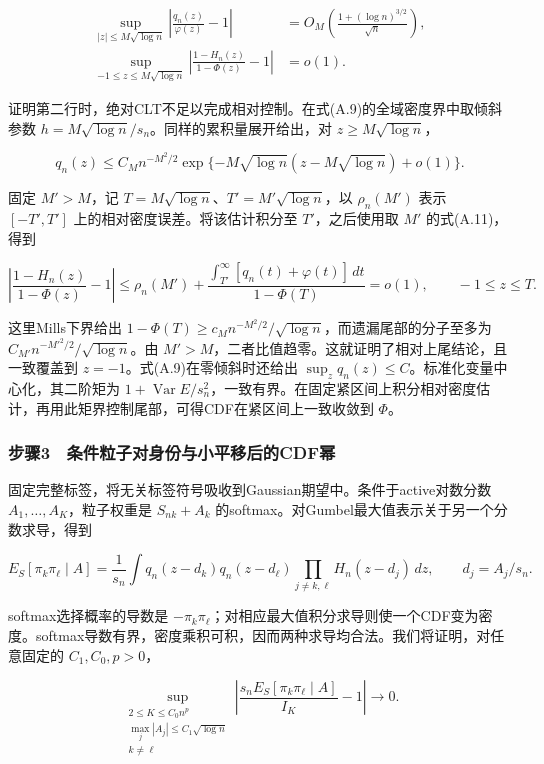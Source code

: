 \documentclass[11pt,a4paper]{article}
\begin{document}
\[
\begin{aligned}
\sup_{|z|\le M\sqrt{\log n}}\left|\frac{q_n(z)}{\varphi(z)}-1\right|
&=O_M\!\left(\frac{1+(\log n)^{3/2}}{\sqrt n}\right),\\
\sup_{-1\le z\le M\sqrt{\log n}}
\left|\frac{1-H_n(z)}{1-\Phi(z)}-1\right|&=o(1).
\end{aligned}
\tag{A.10}
\]

证明第二行时，绝对CLT不足以完成相对控制。在式(A.9)的全域密度界中取倾斜参数
\(h=M\sqrt{\log n}/s_n\)。同样的累积量展开给出，对
\(z\ge M\sqrt{\log n}\)，

\[
q_n(z)\le C_Mn^{-M^2/2}
\exp\{-M\sqrt{\log n}(z-M\sqrt{\log n})+o(1)\}.
\tag{A.11}
\]

固定 \(M'>M\)，记 \(T=M\sqrt{\log n}\)、\(T'=M'\sqrt{\log n}\)，以
\(\rho_n(M')\) 表示 \([-T',T']\) 上的相对密度误差。将该估计积分至
\(T'\)，之后使用取 \(M'\) 的式(A.11)，得到

\[
\left|\frac{1-H_n(z)}{1-\Phi(z)}-1\right|
\le \rho_n(M')+
\frac{\int_{T'}^\infty[q_n(t)+\varphi(t)]\,dt}{1-\Phi(T)}
=o(1),\qquad -1\le z\le T.
\]

这里Mills下界给出
\(1-\Phi(T)\ge c_M n^{-M^2/2}/\sqrt{\log n}\)，而遗漏尾部的分子至多为
\(C_{M'} n^{-M'^2/2}/\sqrt{\log n}\)。由
\(M'>M\)，二者比值趋零。这就证明了相对上尾结论，且一致覆盖到
\(z=-1\)。式(A.9)在零倾斜时还给出
\(\sup_zq_n(z)\le C\)。标准化变量中心化，其二阶矩为
\(1+\operatorname{Var}E/s_n^2\)，一致有界。在固定紧区间上积分相对密度估计，再用此矩界控制尾部，可得CDF在紧区间上一致收敛到
\(\Phi\)。

\subsubsection*{步骤3　条件粒子对身份与小平移后的CDF幂}\label{ux6b65ux9aa43-ux6761ux4ef6ux7c92ux5b50ux5bf9ux8eabux4efdux4e0eux5c0fux5e73ux79fbux540eux7684cdfux5e42}

固定完整标签，将无关标签符号吸收到Gaussian期望中。条件于active对数分数
\(A_1,\ldots,A_K\)，粒子权重是 \(S_{nk}+A_k\)
的softmax。对Gumbel最大值表示关于另一个分数求导，得到

\[
E_S[\pi_k\pi_\ell\mid A]
=\frac1{s_n}\int q_n(z-d_k)q_n(z-d_\ell)
\prod_{j\ne k,\ell}H_n(z-d_j)\,dz,\qquad d_j=A_j/s_n .
\tag{A.12}
\]

softmax选择概率的导数是
\(-\pi_k\pi_\ell\)；对相应最大值积分求导则使一个CDF变为密度。softmax导数有界，密度乘积可积，因而两种求导均合法。我们将证明，对任意固定的
\(C_1,C_0,p>0\)，

\[
\sup_{\substack{2\le K\le C_0n^p\\
\max_j|A_j|\le C_1\sqrt{\log n}\\k\ne\ell}}
\left|\frac{s_nE_S[\pi_k\pi_\ell\mid A]}{I_K}-1\right|\longrightarrow0 .
\tag{A.13}
\]
\end{document}
